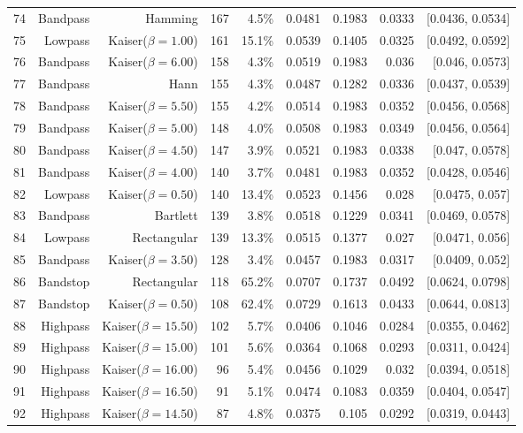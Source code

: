 \begin{longtable}{lrrrrrrrr}
    74 & Bandpass & Hamming & 167 & 4.5\% & 0.0481 & 0.1983 & 0.0333 & [0.0436, 0.0534] \\
    75 & Lowpass & Kaiser($\beta=1.00$) & 161 & 15.1\% & 0.0539 & 0.1405 & 0.0325 & [0.0492, 0.0592] \\
    76 & Bandpass & Kaiser($\beta=6.00$) & 158 & 4.3\% & 0.0519 & 0.1983 & 0.036 & [0.046, 0.0573] \\
    77 & Bandpass & Hann & 155 & 4.3\% & 0.0487 & 0.1282 & 0.0336 & [0.0437, 0.0539] \\
    78 & Bandpass & Kaiser($\beta=5.50$) & 155 & 4.2\% & 0.0514 & 0.1983 & 0.0352 & [0.0456, 0.0568] \\
    79 & Bandpass & Kaiser($\beta=5.00$) & 148 & 4.0\% & 0.0508 & 0.1983 & 0.0349 & [0.0456, 0.0564] \\
    80 & Bandpass & Kaiser($\beta=4.50$) & 147 & 3.9\% & 0.0521 & 0.1983 & 0.0338 & [0.047, 0.0578] \\
    81 & Bandpass & Kaiser($\beta=4.00$) & 140 & 3.7\% & 0.0481 & 0.1983 & 0.0352 & [0.0428, 0.0546] \\
    82 & Lowpass & Kaiser($\beta=0.50$) & 140 & 13.4\% & 0.0523 & 0.1456 & 0.028 & [0.0475, 0.057] \\
    83 & Bandpass & Bartlett & 139 & 3.8\% & 0.0518 & 0.1229 & 0.0341 & [0.0469, 0.0578] \\
    84 & Lowpass & Rectangular & 139 & 13.3\% & 0.0515 & 0.1377 & 0.027 & [0.0471, 0.056] \\
    85 & Bandpass & Kaiser($\beta=3.50$) & 128 & 3.4\% & 0.0457 & 0.1983 & 0.0317 & [0.0409, 0.052] \\
    86 & Bandstop & Rectangular & 118 & 65.2\% & 0.0707 & 0.1737 & 0.0492 & [0.0624, 0.0798] \\
    87 & Bandstop & Kaiser($\beta=0.50$) & 108 & 62.4\% & 0.0729 & 0.1613 & 0.0433 & [0.0644, 0.0813] \\
    88 & Highpass & Kaiser($\beta=15.50$) & 102 & 5.7\% & 0.0406 & 0.1046 & 0.0284 & [0.0355, 0.0462] \\
    89 & Highpass & Kaiser($\beta=15.00$) & 101 & 5.6\% & 0.0364 & 0.1068 & 0.0293 & [0.0311, 0.0424] \\
    90 & Highpass & Kaiser($\beta=16.00$) & 96 & 5.4\% & 0.0456 & 0.1029 & 0.032 & [0.0394, 0.0518] \\
    91 & Highpass & Kaiser($\beta=16.50$) & 91 & 5.1\% & 0.0474 & 0.1083 & 0.0359 & [0.0404, 0.0547] \\
    92 & Highpass & Kaiser($\beta=14.50$) & 87 & 4.8\% & 0.0375 & 0.105 & 0.0292 & [0.0319, 0.0443] \\

\end{longtable}
